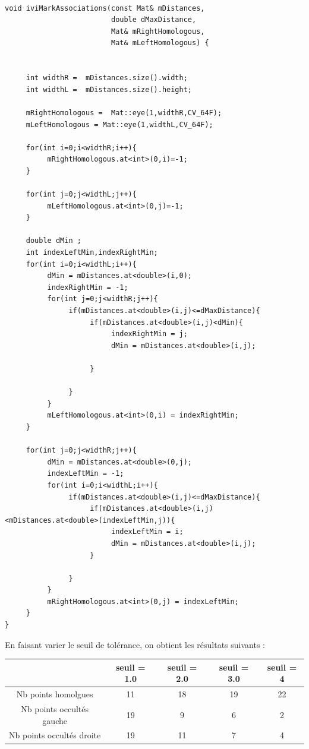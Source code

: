 \documentclass[a4paper,12pt]{report}
\begin{document}
\begin{lstlisting}[style=C++]

void iviMarkAssociations(const Mat& mDistances,
                         double dMaxDistance,
                         Mat& mRightHomologous,
                         Mat& mLeftHomologous) {


     int widthR =  mDistances.size().width;
     int widthL =  mDistances.size().height;

     mRightHomologous =  Mat::eye(1,widthR,CV_64F);
     mLeftHomologous = Mat::eye(1,widthL,CV_64F);

     for(int i=0;i<widthR;i++){
          mRightHomologous.at<int>(0,i)=-1;
     }

     for(int j=0;j<widthL;j++){
          mLeftHomologous.at<int>(0,j)=-1;
     }

     double dMin ;
     int indexLeftMin,indexRightMin;
     for(int i=0;i<widthL;i++){
          dMin = mDistances.at<double>(i,0);
          indexRightMin = -1;
          for(int j=0;j<widthR;j++){
               if(mDistances.at<double>(i,j)<=dMaxDistance){
                    if(mDistances.at<double>(i,j)<dMin){
                         indexRightMin = j;
                         dMin = mDistances.at<double>(i,j);

                    }

               }
          }
          mLeftHomologous.at<int>(0,i) = indexRightMin;
     }

     for(int j=0;j<widthR;j++){
          dMin = mDistances.at<double>(0,j);
          indexLeftMin = -1;
          for(int i=0;i<widthL;i++){
               if(mDistances.at<double>(i,j)<=dMaxDistance){
                    if(mDistances.at<double>(i,j)<mDistances.at<double>(indexLeftMin,j)){
                         indexLeftMin = i;
                         dMin = mDistances.at<double>(i,j);
                    }

               }
          }
          mRightHomologous.at<int>(0,j) = indexLeftMin;
     }
}
\end{lstlisting}
\noindent En faisant varier le seuil de tolérance, on obtient les résultats suivants :\\
\begin{center}
\begin{tabular}{|c|c|c|c|c|}
\hline
      &   seuil = 1.0 & seuil = 2.0 & seuil = 3.0 & seuil = 4 \\
\hline
Nb points homolgues & 11 & 18 & 19 & 22 \\
\hline 
Nb points occultés gauche & 19 & 9 & 6 & 2 \\
\hline
Nb points occultés droite & 19 & 11 & 7 & 4 \\
\hline
\end{tabular}
\end{center}
\end{document}
